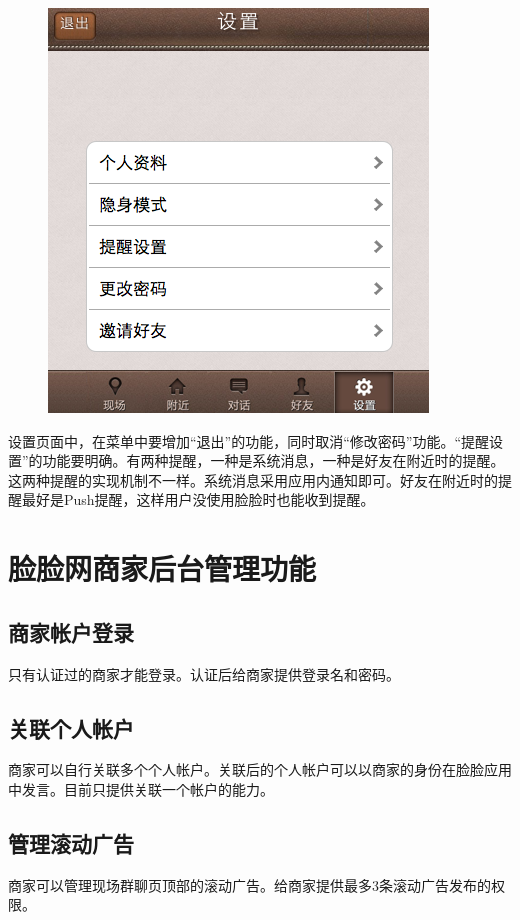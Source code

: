 \documentclass[cs4size]{ctexartutf8}
\begin{document}
\begin{figure}[H]
\centering
\includegraphics[scale=0.5]{./10.png}
\end{figure}

设置页面中，在菜单中要增加“退出”的功能，同时取消“修改密码”功能。“提醒设置”的功能要明确。有两种提醒，一种是系统消息，一种是好友在附近时的提醒。这两种提醒的实现机制不一样。系统消息采用应用内通知即可。好友在附近时的提醒最好是Push提醒，这样用户没使用脸脸时也能收到提醒。



\section{脸脸网商家后台管理功能}
\subsection{商家帐户登录}
只有认证过的商家才能登录。认证后给商家提供登录名和密码。

\subsection{关联个人帐户}
商家可以自行关联多个个人帐户。关联后的个人帐户可以以商家的身份在脸脸应用中发言。目前只提供关联一个帐户的能力。

\subsection{管理滚动广告}
商家可以管理现场群聊页顶部的滚动广告。给商家提供最多3条滚动广告发布的权限。
\end{document}
